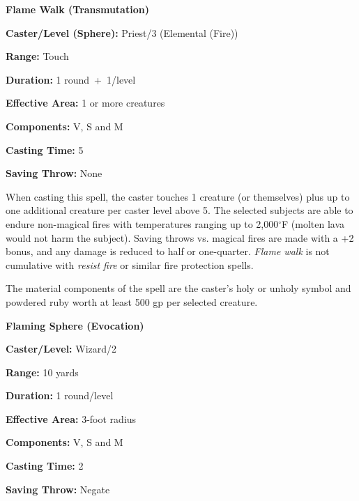\begin{multicols}{2}
\vspace{1em}

\noindent
\begin{minipage}{\columnwidth}

\noindent \textbf{Flame Walk (Transmutation)}

\noindent \textbf{Caster/Level (Sphere):} Priest/3 (Elemental (Fire))

\noindent \textbf{Range:} Touch

\noindent \textbf{Duration:} 1 round~+~1/level

\noindent \textbf{Effective Area:} 1 or more creatures

\noindent \textbf{Components:} V, S and M

\noindent \textbf{Casting Time:} 5

\noindent \textbf{Saving Throw:} None

\end{minipage}

When casting this spell, the caster touches 1 creature (or themselves) plus up to one additional creature per caster level above 5.  The selected subjects are able to endure non-magical fires with temperatures ranging up to 2,000$^\circ$F (molten lava would not harm the subject).  Saving throws vs. magical fires are made with a +2 bonus, and any damage is reduced to half or one-quarter.  \textit{Flame walk} is not cumulative with \textit{resist fire} or similar fire protection spells.

The material components of the spell are the caster's holy or unholy symbol and powdered ruby worth at least 500 gp per selected creature.

\vspace{1em}

\noindent
\begin{minipage}{\columnwidth}

\noindent \textbf{Flaming Sphere (Evocation)}

\noindent \textbf{Caster/Level:} Wizard/2

\noindent \textbf{Range:} 10 yards

\noindent \textbf{Duration:} 1 round/level

\noindent \textbf{Effective Area:} 3-foot radius

\noindent \textbf{Components:} V, S and M

\noindent \textbf{Casting Time:} 2

\noindent \textbf{Saving Throw:} Negate

\end{minipage}


\end{multicols}
